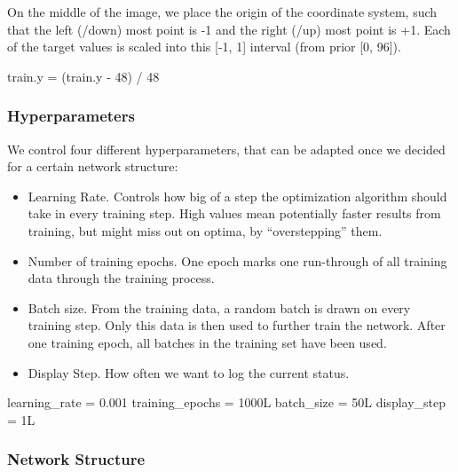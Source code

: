 \documentclass[]{article}
\newenvironment{Shaded}{\begin{snugshade}}{\end{snugshade}}
\newcommand{\DecValTok}[1]{\textcolor[rgb]{0.00,0.00,0.81}{{#1}}}
\newcommand{\FloatTok}[1]{\textcolor[rgb]{0.00,0.00,0.81}{{#1}}}
\newcommand{\StringTok}[1]{\textcolor[rgb]{0.31,0.60,0.02}{{#1}}}
\newcommand{\NormalTok}[1]{{#1}}
\providecommand{\tightlist}{%
  \setlength{\itemsep}{0pt}\setlength{\parskip}{0pt}}
\begin{document}
On the middle of the image, we place the origin of the coordinate
system, such that the left (/down) most point is -1 and the right (/up)
most point is +1. Each of the target values is scaled into this {[}-1,
1{]} interval (from prior {[}0, 96{]}).

\begin{Shaded}
\begin{Highlighting}[]
\NormalTok{train.y =}\StringTok{ }\NormalTok{(train.y -}\StringTok{ }\DecValTok{48}\NormalTok{) /}\StringTok{ }\DecValTok{48}
\end{Highlighting}
\end{Shaded}

\subsubsection{Hyperparameters}\label{hyperparameters}

We control four different hyperparameters, that can be adapted once we
decided for a certain network structure:

\begin{itemize}
\tightlist
\item
  Learning Rate. Controls how big of a step the optimization algorithm
  should take in every training step. High values mean potentially
  faster results from training, but might miss out on optima, by
  ``overstepping'' them.
\item
  Number of training epochs. One epoch marks one run-through of all
  training data through the training process.
\item
  Batch size. From the training data, a random batch is drawn on every
  training step. Only this data is then used to further train the
  network. After one training epoch, all batches in the training set
  have been used.
\item
  Display Step. How often we want to log the current status.
\end{itemize}

\begin{Shaded}
\begin{Highlighting}[]
\NormalTok{learning_rate =}\StringTok{ }\FloatTok{0.001}
\NormalTok{training_epochs =}\StringTok{ }\NormalTok{1000L}
\NormalTok{batch_size =}\StringTok{ }\NormalTok{50L}
\NormalTok{display_step =}\StringTok{ }\NormalTok{1L}
\end{Highlighting}
\end{Shaded}

\subsubsection{Network Structure}\label{network-structure}
\end{document}

